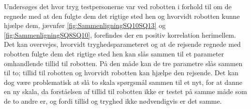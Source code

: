 Undersøges det hvor tryg testpersonerne var ved robotten i forhold til om de regnede med at den fulgte dem det rigtige sted hen og hvorvidt robotten kunne hjælpe dem, jævnfør \autoref{fig:SammenligningSQ10SQ13} og \autoref{fig:SammenligningSQ8SQ10}, forefindes der en positiv korrelation herimellem. Det kan overvejes, hvorvidt tryghedsparameteret og at de rejsende regnede med robotten fulgte dem det rigtige sted hen kan slås sammen til et parameter omhandlende tillid til robotten. På den måde kan de tre parametre slås sammen til to; tillid til robotten og hvorvidt robotten kan hjælpe den rejsende. Det kan dog være problematisk at slå to skala spørgsmål sammen til et nyt, for at danne en ny skala, da forståelsen af tillid til robotten ikke er testet på samme måde som de to andre er, og fordi tillid og tryghed ikke nødvendigvis er det samme. 

